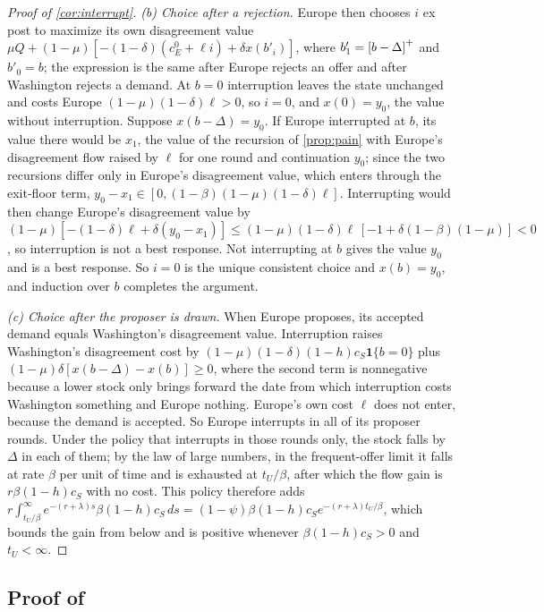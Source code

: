 \begin{proof}[Proof of \cref{cor:interrupt}]
\emph{(b) Choice after a rejection.} Europe then chooses $i$ ex post to maximize its own disagreement value $\mu Q+(1-\mu)[-(1-\delta)(c^0_E+\ell i)+\delta x(b'_i)]$, where $b'_1=\left[b-\Delta\right]^{+}$ and $b'_0=b$; the expression is the same after Europe rejects an offer and after Washington rejects a demand. At $b=0$ interruption leaves the state unchanged and costs Europe $(1-\mu)(1-\delta)\ell>0$, so $i=0$, and $x(0)=y_0$, the value without interruption. Suppose $x(b-\Delta)=y_0$. If Europe interrupted at $b$, its value there would be $x_1$, the value of the recursion of \cref{prop:pain} with Europe's disagreement flow raised by $\ell$ for one round and continuation $y_0$; since the two recursions differ only in Europe's disagreement value, which enters through the exit-floor term, $y_0-x_1\in[0,(1-\beta)(1-\mu)(1-\delta)\ell]$. Interrupting would then change Europe's disagreement value by $(1-\mu)[-(1-\delta)\ell+\delta(y_0-x_1)]\le(1-\mu)(1-\delta)\ell\,[-1+\delta(1-\beta)(1-\mu)]<0$, so interruption is not a best response. Not interrupting at $b$ gives the value $y_0$ and is a best response. So $i=0$ is the unique consistent choice and $x(b)=y_0$, and induction over $b$ completes the argument.

\emph{(c) Choice after the proposer is drawn.} When Europe proposes, its accepted demand equals Washington's disagreement value. Interruption raises Washington's disagreement cost by $(1-\mu)(1-\delta)(1-h)c_S\mathbf 1\{b=0\}$ plus $(1-\mu)\delta[x(b-\Delta)-x(b)]\ge 0$, where the second term is nonnegative because a lower stock only brings forward the date from which interruption costs Washington something and Europe nothing. Europe's own cost $\ell$ does not enter, because the demand is accepted. So Europe interrupts in all of its proposer rounds. Under the policy that interrupts in those rounds only, the stock falls by $\Delta$ in each of them; by the law of large numbers, in the frequent-offer limit it falls at rate $\beta$ per unit of time and is exhausted at $t_U/\beta$, after which the flow gain is $r\beta(1-h)c_S$ with no cost. This policy therefore adds $r\int_{t_U/\beta}^\infty e^{-(r+\lambda)s}\beta(1-h)c_S\,ds=(1-\psi)\beta(1-h)c_Se^{-(r+\lambda)t_U/\beta}$, which bounds the gain from below and is positive whenever $\beta(1-h)c_S>0$ and $t_U<\infty$.
\end{proof}

\subsection{Proof of \texorpdfstring{}{the range of equilibria}}

